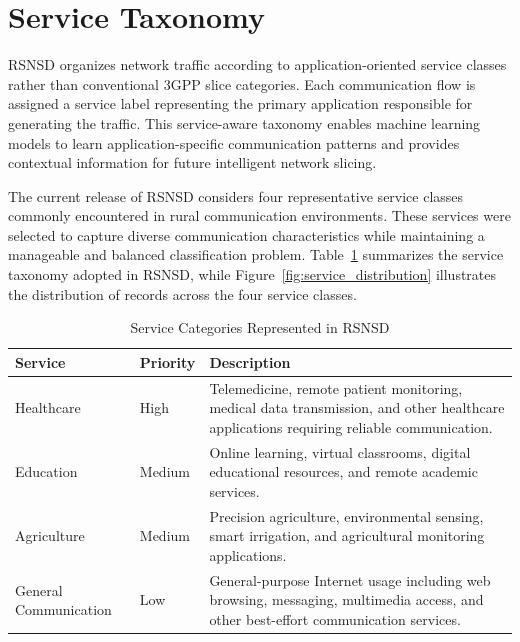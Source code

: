 \documentclass[12pt,a4paper]{report}
\begin{document}
	
\section{Service Taxonomy}
\label{sec:services}

RSNSD organizes network traffic according to application-oriented service classes rather than conventional 3GPP slice categories. Each communication flow is assigned a service label representing the primary application responsible for generating the traffic. This service-aware taxonomy enables machine learning models to learn application-specific communication patterns and provides contextual information for future intelligent network slicing.

The current release of RSNSD considers four representative service classes commonly encountered in rural communication environments. These services were selected to capture diverse communication characteristics while maintaining a manageable and balanced classification problem. Table~\ref{tab:services} summarizes the service taxonomy adopted in RSNSD, while Figure~\ref{fig:service_distribution} illustrates the distribution of records across the four service classes.

\begin{table}[H]
	\centering
	\caption{Service Categories Represented in RSNSD}
	\label{tab:services}
	
	\begin{tabular}{|p{4cm}|p{2cm}|p{8cm}|}
		\hline
		
		\textbf{Service} &
		\textbf{Priority} &
		\textbf{Description}
		\\
		\hline
		
		Healthcare &
		High &
		Telemedicine, remote patient monitoring, medical data transmission, and other healthcare applications requiring reliable communication.
		\\
		\hline
		
		Education &
		Medium &
		Online learning, virtual classrooms, digital educational resources, and remote academic services.
		\\
		\hline
		
		Agriculture &
		Medium &
		Precision agriculture, environmental sensing, smart irrigation, and agricultural monitoring applications.
		\\
		\hline
		
		General Communication &
		Low &
		General-purpose Internet usage including web browsing, messaging, multimedia access, and other best-effort communication services.
		\\
		\hline
	\end{tabular}
		
	\end{table}
	
\end{document}
